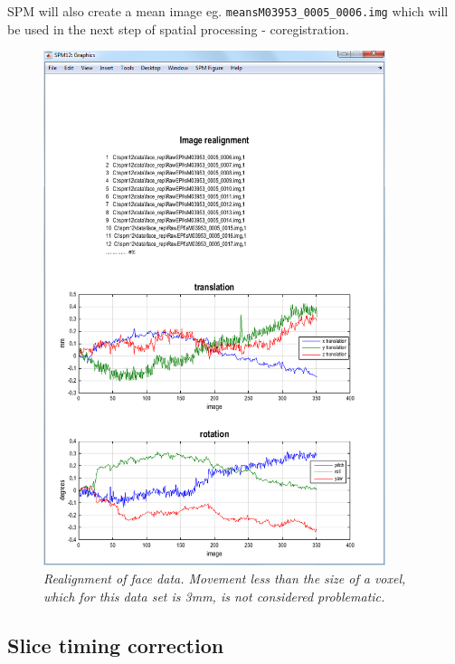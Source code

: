 \documentclass[a4paper,titlepage]{book}
\begin{document}
SPM will also create a mean image eg. 
\verb!meansM03953_0005_0006.img! which will be used in the next
step of spatial processing - coregistration.
\begin{figure}
\begin{center}
\includegraphics[width=100mm]{faces/realign}
\caption{\em Realignment of face data. Movement less than the size of a voxel, which for this data set is 3mm, is not considered problematic. \label{face_realign}}
\end{center}
\end{figure}

\subsection{Slice timing correction}
\end{document}
